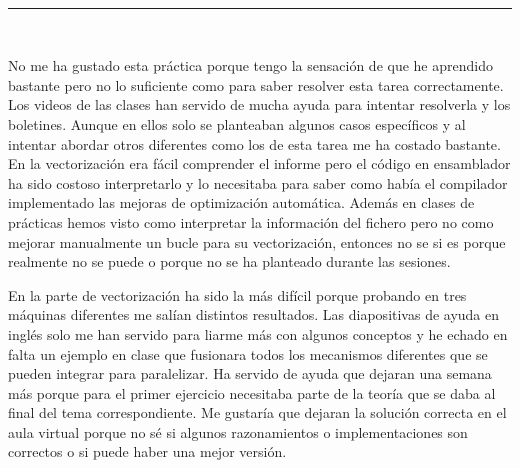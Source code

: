   \begin{center}
	{\fboxrule=4pt } \\
	\rule{15cm}{0pt} \\
\end{center}

\par No me ha gustado esta práctica porque tengo la sensación de que he aprendido bastante pero no lo suficiente como para saber
resolver esta tarea correctamente. Los videos de las clases han servido de mucha ayuda para intentar resolverla y los boletines.
Aunque en ellos solo se planteaban algunos casos específicos y al intentar abordar otros diferentes como los de esta tarea me ha
costado bastante. En la vectorización era fácil comprender el informe pero el código en ensamblador ha sido costoso interpretarlo
y lo necesitaba para saber como había el compilador implementado las mejoras de optimización automática. Además en clases de
prácticas hemos visto como interpretar la información del fichero pero no como mejorar manualmente un bucle para su
vectorización, entonces no se si es porque realmente no se puede o porque no se ha planteado durante las sesiones.
\par En la parte de vectorización ha sido la más difícil porque probando en tres máquinas diferentes me salían distintos resultados. Las
diapositivas de ayuda en inglés solo me han servido para liarme más con algunos conceptos y he echado en falta un ejemplo en
clase que fusionara todos los mecanismos diferentes que se pueden integrar para paralelizar. Ha servido de ayuda que dejaran una
semana más porque para el primer ejercicio necesitaba parte de la teoría que se daba al final del tema correspondiente. Me gustaría
que dejaran la solución correcta en el aula virtual porque no sé si algunos razonamientos o implementaciones son correctos o si
puede haber una mejor versión. 